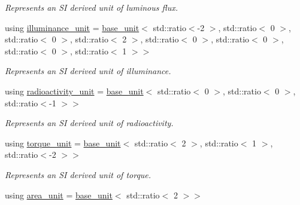 \begin{DoxyCompactItemize}
\begin{DoxyCompactList}\small\item\em Represents an S\+I derived unit of luminous flux. \end{DoxyCompactList}\item 
\hypertarget{namespaceunits_1_1category_aaec672317a59eeaeac88c0be6bcea12c}{}using \hyperlink{namespaceunits_1_1category_aaec672317a59eeaeac88c0be6bcea12c}{illuminance\+\_\+unit} = \hyperlink{structunits_1_1base__unit}{base\+\_\+unit}$<$ std\+::ratio$<$-\/2 $>$, std\+::ratio$<$ 0 $>$, std\+::ratio$<$ 0 $>$, std\+::ratio$<$ 2 $>$, std\+::ratio$<$ 0 $>$, std\+::ratio$<$ 0 $>$, std\+::ratio$<$ 0 $>$, std\+::ratio$<$ 1 $>$$>$\label{namespaceunits_1_1category_aaec672317a59eeaeac88c0be6bcea12c}

\begin{DoxyCompactList}\small\item\em Represents an S\+I derived unit of illuminance. \end{DoxyCompactList}\item 
\hypertarget{namespaceunits_1_1category_a0ce14d5661fcd514f6160000c1b3ac2a}{}using \hyperlink{namespaceunits_1_1category_a0ce14d5661fcd514f6160000c1b3ac2a}{radioactivity\+\_\+unit} = \hyperlink{structunits_1_1base__unit}{base\+\_\+unit}$<$ std\+::ratio$<$ 0 $>$, std\+::ratio$<$ 0 $>$, std\+::ratio$<$-\/1 $>$$>$\label{namespaceunits_1_1category_a0ce14d5661fcd514f6160000c1b3ac2a}

\begin{DoxyCompactList}\small\item\em Represents an S\+I derived unit of radioactivity. \end{DoxyCompactList}\item 
\hypertarget{namespaceunits_1_1category_a751792d53b9d7b10e926c65f0e0e2980}{}using \hyperlink{namespaceunits_1_1category_a751792d53b9d7b10e926c65f0e0e2980}{torque\+\_\+unit} = \hyperlink{structunits_1_1base__unit}{base\+\_\+unit}$<$ std\+::ratio$<$ 2 $>$, std\+::ratio$<$ 1 $>$, std\+::ratio$<$-\/2 $>$$>$\label{namespaceunits_1_1category_a751792d53b9d7b10e926c65f0e0e2980}

\begin{DoxyCompactList}\small\item\em Represents an S\+I derived unit of torque. \end{DoxyCompactList}\item 
\hypertarget{namespaceunits_1_1category_af6be136b7d9c842cb68b24eac22e79d1}{}using \hyperlink{namespaceunits_1_1category_af6be136b7d9c842cb68b24eac22e79d1}{area\+\_\+unit} = \hyperlink{structunits_1_1base__unit}{base\+\_\+unit}$<$ std\+::ratio$<$ 2 $>$$>$\label{namespaceunits_1_1category_af6be136b7d9c842cb68b24eac22e79d1}


\end{DoxyCompactItemize}
